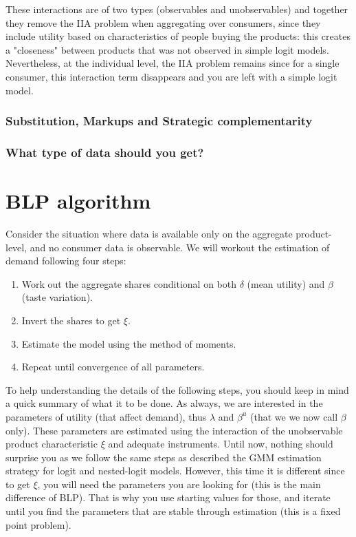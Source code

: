 \documentclass[12pt]{report}
\begin{document}
These interactions are of two types (observables and unobservables) and together they remove the IIA problem when aggregating over consumers, since they include utility based on characteristics of people buying the products: this creates a "closeness" between products that was not observed in simple logit models. Nevertheless, at the individual level, the IIA problem remains since for a single consumer, this interaction term disappears and you are left with a simple logit model.

\subsubsection{Substitution, Markups and Strategic complementarity}



\subsubsection{What type of data should you get?}



\section{BLP algorithm}

Consider the situation where data is available only on the aggregate product-level, and no consumer data is observable. We will workout the estimation of demand following four steps:\begin{enumerate}
\item Work out the aggregate shares conditional on both $\delta$ (mean utility) and $\beta$ (taste variation).
\item Invert the shares to get $\xi$.
\item Estimate the model using the method of moments.
\item Repeat until convergence of all parameters.
\end{enumerate}

To help understanding the details of the following steps, you should keep in mind a quick summary of what it to be done. As always, we are interested in the parameters of utility (that affect demand), thus $\lambda$ and $\beta^u$ (that we we now call $\beta$ only). These parameters are estimated using the interaction of the unobservable product characteristic $\xi$ and adequate instruments. Until now, nothing should surprise you as we follow the same steps as described the GMM estimation strategy for logit and nested-logit models. However, this time it is different since to get $\xi$, you will need the parameters you are looking for (this is the main difference of BLP). That is why you use starting values for those, and iterate until you find the parameters that are stable through estimation (this is a fixed point problem).
\end{document}
